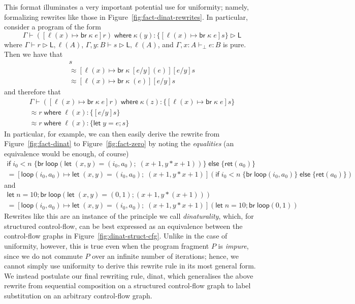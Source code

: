 \documentclass[acmsmall,screen,review]{acmart}
\newcommand{\ms}[1]{\ensuremath{\mathsf{#1}}}
\newcommand{\lto}{:}
\newcommand{\letexpr}[3]{\ensuremath{\ms{let}\;#1 = #2;\;#3}}
\newcommand{\letstmt}[3]{\ensuremath{\ms{let}\;#1 = #2; #3}}
\newcommand{\brb}[2]{\ms{br}\;#1\;#2}
\newcommand{\where}[2]{#1\;\ms{where}\;#2}
\newcommand{\wbranch}[3]{#1(#2) \lto \{#3\}}
\newcommand{\bhyp}[2]{#1 : #2}
\newcommand{\hasty}[4]{#1 \vdash_{#2} #3: {#4}}
\newcommand{\haslb}[3]{#1 \vdash #2 \rhd #3}
\newcommand{\teqv}{\approx}
\newcommand{\brle}[1]{{\textsf{#1}}}
\begin{document}
This format illuminates a very important potential use for uniformity; namely, formalizing rewrites
like those in Figure~\ref{fig:fact-dinat-rewrites}. In particular, consider a program of the form
\begin{equation*}
  \haslb{\Gamma}{\where{([\ell(x) \mapsto \brb{\kappa}{e}]r)}{
    \wbranch{\kappa}{y}{[\ell(x) \mapsto \brb{\kappa}{e}]s}
  }}{\ms{L}}
\end{equation*}
where $\haslb{\Gamma}{r}{\ms{L}, \ell(A)}$, $\haslb{\Gamma, y : B}{s}{\ms{L}, \ell(A)}$, and
$\hasty{\Gamma, \bhyp{x}{A}}{\bot}{e}{B}$ is pure. Then we have that
\begin{multline*}
  [e/y][\ell(x) \mapsto \brb{\kappa}{(e)}]s 
  \\ \teqv
  [\ell(x) \mapsto \brb{\kappa}{[e/y](e)}][e/y]s
  \\ \teqv
  [\ell(x) \mapsto \brb{\kappa}{(e)}][e/y]s
\end{multline*}
and therefore that
\begin{multline*}
  \Gamma \vdash \where{([\ell(x) \mapsto \brb{\kappa}{e}]r)}{
    \wbranch{\kappa}{z}{[\ell(x) \mapsto \brb{\kappa}{e}]s}} \\ \teqv
    \where{r}{
    \wbranch{\ell}{x}{[e/y]s}} \\ \teqv
    \where{r}{
    \wbranch{\ell}{x}{\letstmt{y}{e}{s}}} 
\end{multline*}
In particular, for example, we can then easily derive the rewrite from Figure~\ref{fig:fact-dinat}
to Figure~\ref{fig:fact-zero} by noting the \emph{equalities} (an equivalence would be enough, of
course)
\begin{multline*}
  \ms{if}\;i_0 < n\;\{
    \ms{br}\;\ms{loop}(
      \letexpr{(x, y)}{(i_0, a_0)}{(x + 1, y * x + 1)}
    )
  \}\;\ms{else}\;\{
    \ms{ret}(a_0)
  \} \\
  =
  [\ms{loop}(i_0, a_0) \mapsto \letexpr{(x, y)}{(i_0, a_0)}{(x + 1, y * x + 1)}](
    \ms{if}\;i_0 < n\;\{
      \ms{br}\;\ms{loop}(i_0, a_0)
    \}\;\ms{else}\;\{
      \ms{ret}(a_0)
    \}
  )
\end{multline*}
and
\begin{multline*}
  \letstmt{n}{10}{\ms{br}\;\ms{loop}(
    \letstmt{(x, y)}{(0, 1)}{(x + 1, y * (x + 1))}
  )} \\
  =
  [\ms{loop}(i_0, a_0) \mapsto \letexpr{(x, y)}{(i_0, a_0)}{(x + 1, y * x + 1)}](
    \letstmt{n}{10}{\ms{br}\;\ms{loop}(0, 1)}
  )
\end{multline*}
Rewrites like this are an instance of the principle we call \emph{dinaturality}, which, for
structured control-flow, can be best expressed as an equivalence between the control-flow graphs
in Figure~\ref{fig:dinat-struct-cfg}. Unlike in the case of uniformity, however, this is true even
when the program fragment $P$ is \emph{impure}, since we do not commute $P$ over an infinite number
of iterations; hence, we cannot simply use uniformity to derive this rewrite rule in its most
general form. We instead postulate our final rewriting rule, \brle{dinat}, which generalises the
above rewrite from sequential composition on a structured control-flow graph to label substitution
on an arbitrary control-flow graph. 
\end{document}

